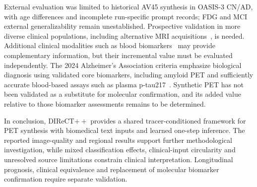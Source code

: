 External evaluation was limited to historical AV45 synthesis in OASIS-3 CN/AD, with age differences and incomplete run-specific prompt records; FDG and MCI external generalizability remain unestablished. Prospective validation in more diverse clinical populations, including alternative MRI acquisitions~\cite{sorby2024portable}, is needed. Additional clinical modalities such as blood biomarkers~\cite{hansson2023blood} may provide complementary information, but their incremental value must be evaluated independently. The 2024 Alzheimer's Association criteria emphasize biological diagnosis using validated core biomarkers, including amyloid PET and sufficiently accurate blood-based assays such as plasma p-tau217~\cite{jack2024revised}. Synthetic PET has not been validated as a substitute for molecular confirmation, and its added value relative to those biomarker assessments remains to be determined.

In conclusion, DIReCT$++$ provides a shared tracer-conditioned framework for PET synthesis with biomedical text inputs and learned one-step inference. The reported image-quality and regional results support further methodological investigation, while mixed classification effects, clinical-input circularity and unresolved source limitations constrain clinical interpretation. Longitudinal prognosis, clinical equivalence and replacement of molecular biomarker confirmation require separate validation.
